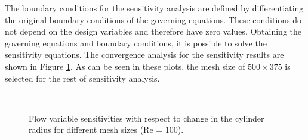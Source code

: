 The boundary conditions for the sensitivity analysis are defined by differentiating the original boundary conditions of the governing equations. These conditions do not depend on the design variables and therefore have zero values. Obtaining the governing equations and boundary conditions, it is possible to solve the sensitivity equations. The convergence analysis for the sensitivity results are shown in Figure \ref{fig:C4_flowOverCylinderSAmeshConvergence}. As can be seen in these plots, the mesh size of $500 \times 375$ is selected for the rest of sensitivity analysis.
%
\begin{figure}[H]
    \centering
    \quad
    \\
    \caption{Flow variable sensitivities with respect to change in the cylinder radius for different mesh sizes (Re = 100).}
    \label{fig:C4_flowOverCylinderSAmeshConvergence}
\end{figure}
%
